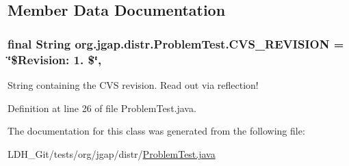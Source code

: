 \subsection{Member Data Documentation}
\hypertarget{classorg_1_1jgap_1_1distr_1_1_problem_test_a1cef738828cf20f53b8dea78ee9e6a89}{
\subsubsection[{C\-V\-S\-\_\-\-R\-E\-V\-I\-S\-I\-O\-N}]{\setlength{\rightskip}{0pt plus 5cm}final String org.\-jgap.\-distr.\-Problem\-Test.\-C\-V\-S\-\_\-\-R\-E\-V\-I\-S\-I\-O\-N = \char`\"{}\$Revision\-: 1. \$\char`\"{}\hspace{0.3cm}{\ttfamily [static]}, {\ttfamily [private]}}}\label{classorg_1_1jgap_1_1distr_1_1_problem_test_a1cef738828cf20f53b8dea78ee9e6a89}
String containing the C\-V\-S revision. Read out via reflection! 

Definition at line 26 of file Problem\-Test.\-java.



The documentation for this class was generated from the following file\-:\begin{DoxyCompactItemize}
\item 
L\-D\-H\-\_\-\-Git/tests/org/jgap/distr/\hyperlink{_problem_test_8java}{Problem\-Test.\-java}\end{DoxyCompactItemize}
